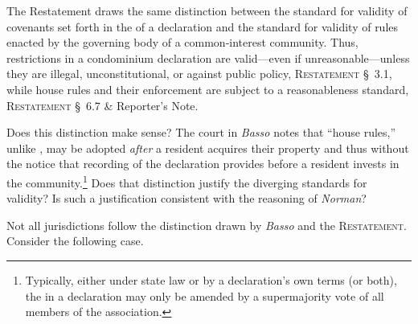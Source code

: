 The Restatement draws the same distinction between the standard for validity of
covenants set forth in the  of a declaration and the standard for
validity of rules enacted by the governing body of a common-interest community.
Thus, restrictions in a condominium declaration are valid---even if
unreasonable---unless they are illegal, unconstitutional, or against public
policy, \textsc{Restatement} \S~3.1, while house rules and their enforcement are
subject to a reasonableness standard, \textsc{Restatement} \S~6.7 \& Reporter's
Note.

Does this distinction make sense? The court in \textit{Basso} notes that ``house
rules,'' unlike , may be adopted \textit{after} a resident acquires
their property and thus without the notice that recording of the declaration
provides before a resident invests in the community.\footnote{Typically, either
under state law or by a declaration's own terms (or both), the  in
a declaration may only be amended by a supermajority vote of all members of the
association.} Does that distinction justify the diverging standards for
validity? Is such a justification consistent with the reasoning of
\textit{Norman}?


\item Not all jurisdictions follow the distinction drawn by \textit{Basso} and
the \textsc{Restatement}. Consider the following case. 


